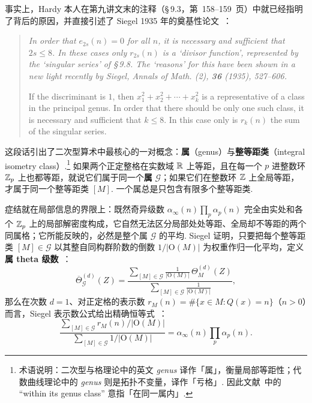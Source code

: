 事实上，Hardy 本人在第九讲文末的注释（\S\,9.3，第~158--159~页）中就已经指明了背后的原因，并直接引述了 Siegel 1935 年的奠基性论文~\cite{Siegel1935,Hardy1940}：
\begin{quote}
\itshape
In order that $e_{2s}(n)=0$ for all $n$, it is necessary and sufficient that $2s\le 8$. In these cases only $r_{2s}(n)$ is a `divisor function', represented by the `singular series' of \S\,9.8. The `reasons' for this have been shown in a new light recently by Siegel, \textup{Annals of Math.} (2), \textbf{36} (1935), 527--606.

If the discriminant is $1$, then $x_1^2+x_2^2+\cdots+x_k^2$ is a representative of a class in the principal genus. In order that there should be only one such class, it is necessary and sufficient that $k\le 8$. In this case only is $r_k(n)$ the sum of the singular series.
\end{quote}

这段话引出了二次型算术中最核心的一对概念：\textbf{属}（genus）与\textbf{整等距类}（integral isometry class）.\footnote{术语说明：二次型与格理论中的英文 \emph{genus} 译作「属」，衡量局部等距性；代数曲线理论中的 \emph{genus} 则是拓扑不变量，译作「亏格」. 因此文献~\cite[第~331~页]{Li2023}中的 “within its genus class” 意指「在同一属内」.} 如果两个正定整格在实数域 $\mathbb{R}$ 上等距，且在每一个 $p$ 进整数环 $\mathbb{Z}_p$ 上也都等距，就说它们属于同一个\textbf{属} $\mathcal G$；如果它们在整数环 $\mathbb{Z}$ 上全局等距，才属于同一个整等距类 $[M]$. 一个属总是只包含有限多个整等距类.

症结就在局部信息的界限上：既然奇异级数 $\alpha_\infty(n)\prod_p\alpha_p(n)$ 完全由实处和各个 $\mathbb{Z}_p$ 上的局部解密度构成，它自然无法区分局部处处等距、全局却不等距的两个同属格；它所能反映的，必然是整个属 $\mathcal G$ 的平均. Siegel 证明，只要把每个整等距类 $[M]\in\mathcal G$ 以其整自同构群阶数的倒数 $1/|\mathrm O(M)|$ 为权重作归一化平均，定义\textbf{属 theta 级数}~\cite[式~(2.1.3.1)]{Li2023}：
\[
\overline{\Theta}_{\mathcal G}^{(d)}(Z)
=\frac{\displaystyle\sum_{[M]\in\mathcal G}\frac{1}{|\mathrm O(M)|}\,\Theta_M^{(d)}(Z)}
      {\displaystyle\sum_{[M]\in\mathcal G}\frac{1}{|\mathrm O(M)|}},
\]
那么在次数 $d=1$、对正定格的表示数 $r_M(n)=\#\{x\in M:Q(x)=n\}$（$n>0$）而言，Siegel 表示数公式给出精确恒等式~\cite{Siegel1935,Li2023}：
\[
\frac{\displaystyle\sum_{[M]\in\mathcal G} r_M(n)/|\mathrm O(M)|}
     {\displaystyle\sum_{[M]\in\mathcal G} 1/|\mathrm O(M)|}
=\alpha_\infty(n)\prod_p\alpha_p(n).
\]

